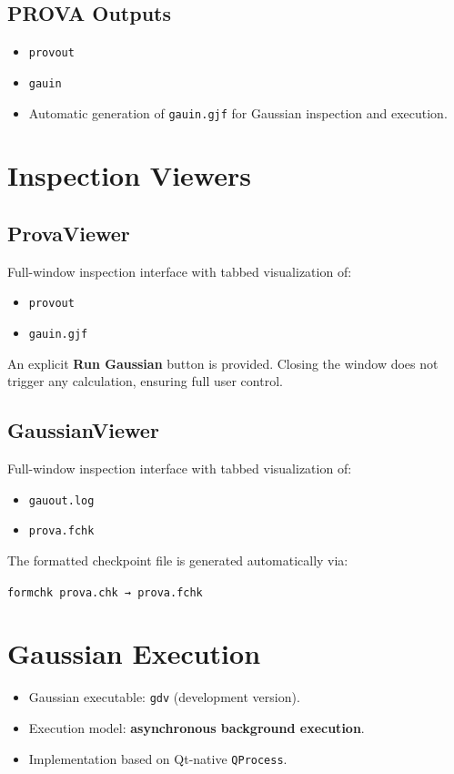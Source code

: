 \documentclass[11pt,a4paper]{article}
\begin{document}
\subsection*{PROVA Outputs}
\begin{itemize}[nosep]
  \item \texttt{provout}
  \item \texttt{gauin}
  \item Automatic generation of \texttt{gauin.gjf} for Gaussian inspection and execution.
\end{itemize}

\section*{Inspection Viewers}

\subsection*{ProvaViewer}
Full-window inspection interface with tabbed visualization of:
\begin{itemize}[nosep]
  \item \texttt{provout}
  \item \texttt{gauin.gjf}
\end{itemize}

An explicit \textbf{Run Gaussian} button is provided.
Closing the window does not trigger any calculation, ensuring full user control.

\subsection*{GaussianViewer}
Full-window inspection interface with tabbed visualization of:
\begin{itemize}[nosep]
  \item \texttt{gauout.log}
  \item \texttt{prova.fchk}
\end{itemize}

The formatted checkpoint file is generated automatically via:
\begin{center}
\texttt{formchk prova.chk → prova.fchk}
\end{center}

\section*{Gaussian Execution}

\begin{itemize}[nosep]
  \item Gaussian executable: \texttt{gdv} (development version).
  \item Execution model: \textbf{asynchronous background execution}.
  \item Implementation based on Qt-native \texttt{QProcess}.
\end{itemize}
\end{document}
